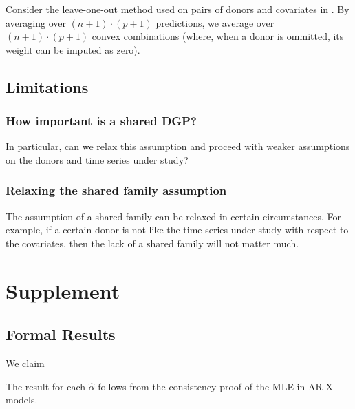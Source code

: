 \documentclass{uiucthesis2021}
\theoremstyle{definition}
\newenvironment{proof-of-proposition}[1][{}]{\noindent{\bf
    Proof of Proposition {#1}}
  \hspace*{.5em}}{\qed\bigskip\\}
\begin{document}
Consider the leave-one-out method used on pairs of donors and covariates in \cite{lundquist2024volatility}.  By averaging over $(n+1)\cdot (p+1)$ predictions, we average over $(n+1) \cdot (p + 1)$ convex combinations (where, when a donor is ommitted, its weight can be imputed as zero).

\subsection{Limitations}\label{Limitations}

\subsubsection{How important is a shared DGP?}
In particular, can we relax this assumption and proceed with weaker assumptions on the donors and time series under study?

\subsubsection{Relaxing the shared family assumption} The assumption of a shared family can be relaxed in certain circumstances.  For example, if a certain donor is not like the time series under study with respect to the covariates, then the lack of a shared family will not matter much.

\section{Supplement}

\subsection{Formal Results}

\begin{proof-of-proposition}[\ref{ARIMA_param_consistency}]
  We claim

  The result for each $\hat\alpha$ follows from the consistency proof of the MLE in AR-X models.
  
  \end{proof-of-proposition}
\end{document}
